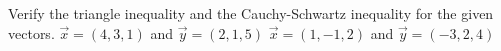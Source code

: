 
\begin{Exercise}[
name={},
title={}, 
difficulty=0,
origin={\cite{SM}}]
Verify the triangle inequality and the Cauchy-Schwartz inequality for the given vectors.
\Question $\vec{x} = (4,3,1)$ and $\vec{y} = (2,1,5)$
\Question $\vec{x}=(1,-1,2)$ and $\vec{y} = (-3,2,4)$
\end{Exercise}

\begin{Answer}
\end{Answer}
